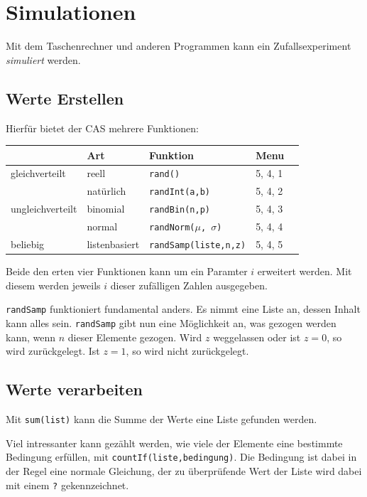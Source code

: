 \documentclass{article}
\begin{document}
\section{Simulationen}
Mit dem Taschenrechner und anderen Programmen kann ein Zufallsexperiment \emph{simuliert} werden.
 
\subsection{Werte Erstellen} 
Hierfür bietet der CAS mehrere Funktionen:
\begin{center}
 \begin{tabular}{lllll}
  & Art & Funktion &  Menu \\
  \toprule
  gleichverteilt & reell & \texttt{rand()} & 5, 4, 1\\
  & natürlich & \texttt{randInt(a,b)} & 5, 4, 2 \\
  ungleichverteilt & binomial & \texttt{randBin(n,p)} & 5, 4, 3 \\
  & normal & \texttt{randNorm($\mu$, $\sigma$)} & 5, 4, 4 \\
  \midrule
  beliebig & listenbasiert & \texttt{randSamp(liste,n,z)} & 5, 4, 5 \\
  \bottomrule
 \end{tabular}
\end{center} 
Beide den erten vier Funktionen kann um ein Paramter $i$ erweitert werden. Mit diesem werden jeweils $i$ dieser zufälligen Zahlen ausgegeben.
 
\texttt{randSamp} funktioniert fundamental anders. Es nimmt eine Liste an, dessen Inhalt kann alles sein. \texttt{randSamp} gibt nun eine Möglichkeit an, was gezogen werden kann, wenn $n$ dieser Elemente gezogen. Wird $z$ weggelassen oder ist $z=0$, so wird zurückgelegt. Ist $z=1$, so wird nicht zurückgelegt.
 
\subsection{Werte verarbeiten}
Mit \texttt{sum(list)} kann die Summe der Werte eine Liste gefunden werden.
 
Viel intressanter kann gezählt werden, wie viele der Elemente eine bestimmte Bedingung erfüllen, mit \texttt{countIf(liste,bedingung)}. Die Bedingung ist dabei in der Regel eine normale Gleichung, der zu überprüfende Wert der Liste wird dabei mit einem \texttt{?} gekennzeichnet.
\end{document}

